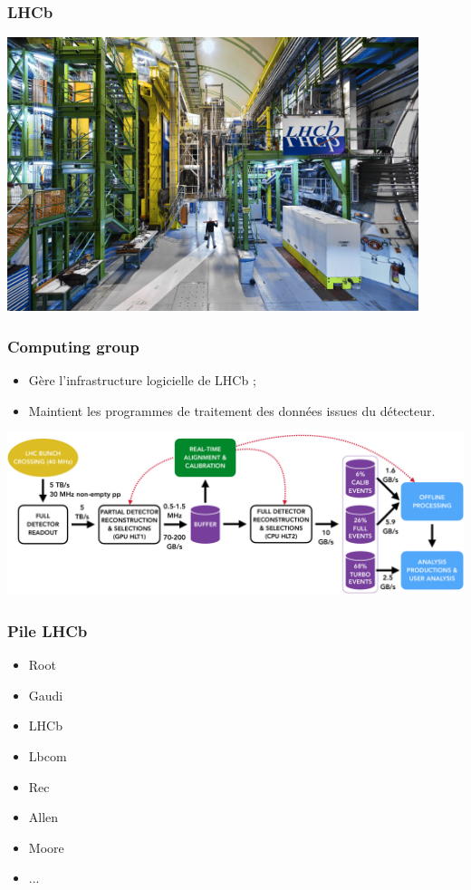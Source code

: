 \documentclass{beamer}
\begin{document}
\begin{frame}
    \frametitle{LHCb}

    \centering
    \includegraphics[width=0.9\textwidth]{LHCb.jpg}
\end{frame}

\begin{frame}
    \frametitle{Computing group}

    \begin{itemize}
        \item Gère l'infrastructure logicielle de LHCb ;
        \item Maintient les programmes de traitement des données issues du détecteur.
    \end{itemize}

    \includegraphics[width=\textwidth]{LHCb_stack.png}
\end{frame}

\begin{frame}
    \frametitle{Pile LHCb}

    \begin{itemize}
        \item Root
        \item Gaudi
        \item LHCb
        \item Lbcom
        \item Rec
        \item Allen
        \item Moore
        \item ...
    \end{itemize}
\end{frame}
\end{document}
